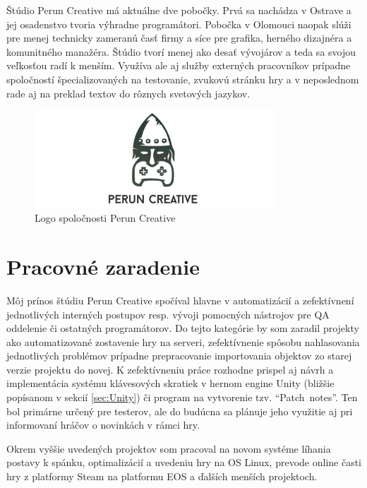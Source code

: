 \documentclass[slovak, bachelorpractice]{diploma}
\begin{document}
Štúdio Perun Creative má aktuálne dve pobočky. Prvá sa nachádza v Ostrave a jej osadenstvo tvoria výhradne programátori. Pobočka v Olomouci naopak slúži pre menej technicky zameranú časť firmy a síce pre grafika, herného dizajnéra a komunitného manažéra. Štúdio tvorí menej ako desať vývojárov a teda sa svojou veľkosťou radí k menším. Využíva ale aj služby externých pracovníkov prípadne spoločností špecializovaných na testovanie, zvukovú stránku hry a v neposlednom rade aj na preklad textov do rôznych svetových jazykov.
\vspace{-5pt}
\begin{figure}[!htbp]
	\centering
	\includegraphics[width=0.8\textwidth]{Pictures/logoNew.jpg}
	\vspace{-5pt}
	\caption{Logo spoločnosti Perun Creative}
	\label{pic:perunLogo}
\end{figure}
\section{Pracovné zaradenie}
\label{sec:Me}
Môj prínos štúdiu Perun Creative spočíval hlavne v automatizácií a zefektívnení jednotlivých interných postupov resp. vývoji pomocných nástrojov pre QA oddelenie či ostatných programátorov. Do tejto kategórie by som zaradil projekty ako automatizované zostavenie hry na serveri, zefektívnenie spôsobu nahlasovania jednotlivých problémov prípadne prepracovanie importovania objektov zo starej verzie projektu do novej. K zefektívneniu práce rozhodne prispel aj návrh a implementácia systému klávesových skratiek v hernom engine Unity (bližšie popísanom v sekcií \ref{sec:Unity}) či  program na vytvorenie tzv. \mbox{\enquote{Patch notes}}. Ten bol primárne určený pre testerov, ale do budúcna sa plánuje jeho využitie aj pri informovaní hráčov o novinkách v rámci hry.

Okrem vyššie uvedených projektov som pracoval na novom systéme líhania postavy k spánku, optimalizácií a uvedeniu hry na OS Linux, prevode online časti hry z platformy Steam na platformu EOS a ďalších menších projektoch.
\end{document}
